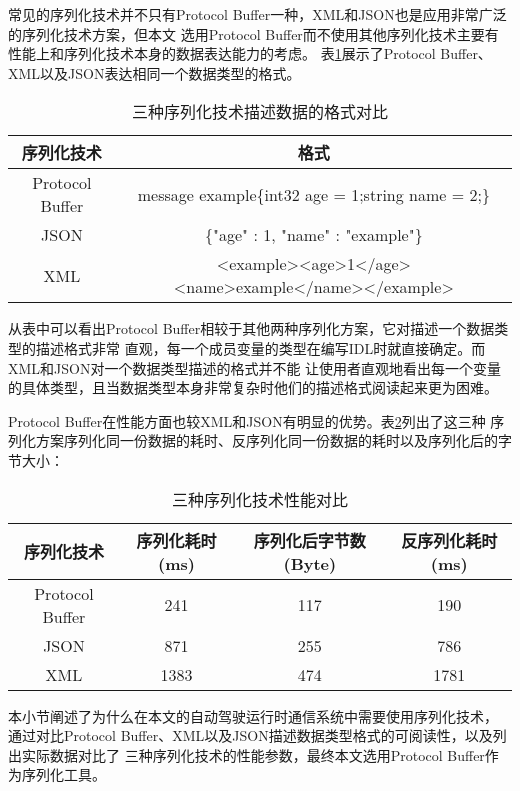 常见的序列化技术并不只有Protocol Buffer一种，XML和JSON也是应用非常广泛的序列化技术方案，但本文
选用Protocol Buffer而不使用其他序列化技术主要有性能上和序列化技术本身的数据表达能力的考虑。
表\ref{serialize_tool_compare}展示了Protocol Buffer、XML以及JSON表达相同一个数据类型的格式。
\begin{table}[H]
  \centering\small
  \caption{三种序列化技术描述数据的格式对比\cite{6215346}}
  \label{serialize_tool_compare}
  \begin{tabular}{cc}
    \toprule
    序列化技术   &  格式                                       \\
    \midrule
    Protocol Buffer & message example\{int32 age = 1;string name = 2;\}  \\
    JSON & \{"age" : 1, "name" : "example"\}   \\
    XML & <example><age>1</age><name>example</name></example>       \\
    \bottomrule
  \end{tabular}
\end{table}
从表中可以看出Protocol Buffer相较于其他两种序列化方案，它对描述一个数据类型的描述格式非常
直观，每一个成员变量的类型在编写IDL时就直接确定。而XML和JSON对一个数据类型描述的格式并不能
让使用者直观地看出每一个变量的具体类型，且当数据类型本身非常复杂时他们的描述格式阅读起来更为困难。

Protocol Buffer在性能方面也较XML和JSON有明显的优势。表\ref{serialize_performance_compare}列出了这三种
序列化方案序列化同一份数据的耗时、反序列化同一份数据的耗时以及序列化后的字节大小\cite{proto}：
\begin{table}[H]
  \centering\small
  \caption{三种序列化技术性能对比}
  \label{serialize_performance_compare}
  \begin{tabular}{cccc}
    \toprule
    序列化技术 & 序列化耗时(ms) & 序列化后字节数(Byte) & 反序列化耗时(ms)                                       \\
    \midrule
    Protocol Buffer & 241 & 117 & 190 \\
    JSON & 871 & 255 & 786 \\
    XML & 1383 & 474 & 1781 \\
    \bottomrule
  \end{tabular}
\end{table}


本小节阐述了为什么在本文的自动驾驶运行时通信系统中需要使用序列化技术，
通过对比Protocol Buffer、XML以及JSON描述数据类型格式的可阅读性，以及列出实际数据对比了
三种序列化技术的性能参数，最终本文选用Protocol Buffer作为序列化工具。
